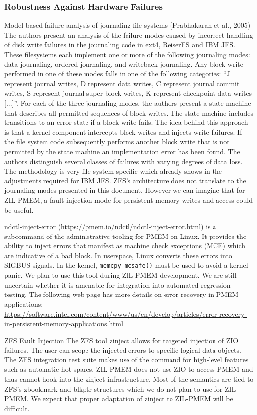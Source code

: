 \documentclass[12pt,a4paper,twoside,draft]{book}
\begin{document}
\subsubsection{ Robustness Against Hardware Failures}
Model-based failure analysis of journaling file systems (Prabhakaran et al., 2005) The authors present an analysis of the failure modes caused by incorrect handling of disk write failures in the journaling code in ext4, ReiserFS and IBM JFS. These filesystems each implement one or more of the following journaling modes: data journaling, ordered journaling, and writeback journaling.  Any block write performed in one of these modes falls in one of the following categories: “J represent journal writes, D represent data writes, C represent journal commit writes, S represent journal super block writes, K represent checkpoint data writes [...]”. For each of the three journaling modes, the authors present a state machine that describes all permitted sequences of block writes. The state machine includes transitions to an error state if a block write fails.
The idea behind this approach is that a kernel component intercepts block writes and injects write failures. If the file system code subsequently performs another block write that is not permitted by the state machine an implementation error has been found. The authors distinguish several classes of failures with varying degrees of data loss.
The methodology is very file system specific which already shows in the adjustments required for IBM JFS.
ZFS’s architecture does not translate to the journaling modes presented in this document. However we can imagine that for ZIL-PMEM, a fault injection mode for persistent memory writes and access could be useful.

ndctl-inject-error (\url{https://pmem.io/ndctl/ndctl-inject-error.html}) is a subcommand of the administrative tooling for PMEM on Linux. It provides the ability to inject errors that manifest as machine check exceptions (MCE) which are indicative of a bad block. In userspace, Linux converts these errors into SIGBUS signals. In the kernel, \lstinline{memcpy_mcsafe()} must be used to avoid a kernel panic.
We plan to use this tool during ZIL-PMEM development. We are still uncertain whether it is amenable for integration into automated regression testing.
The following web page has more details on error recovery in PMEM applications: \url{https://software.intel.com/content/www/us/en/develop/articles/error-recovery-in-persistent-memory-applications.html}

ZFS Fault Injection The ZFS tool zinject allows for targeted injection of ZIO failures. The user can scope the injected errors to specific logical data objects. The ZFS integration test suite makes use of the command for high-level features such as automatic hot spares.
ZIL-PMEM does not use ZIO to access PMEM and thus cannot hook into the zinject infrastructure. Most of the semantics are tied to ZFS’s zbookmark and blkptr structures which we do not plan to use for ZIL-PMEM. We expect that proper adaptation of zinject to ZIL-PMEM will be difficult.
\end{document}
